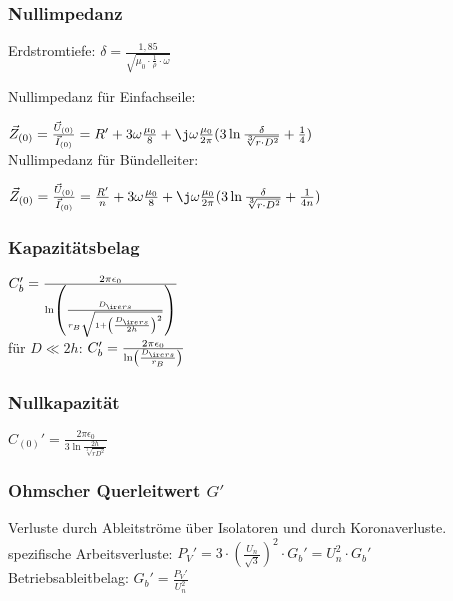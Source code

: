 \documentclass[german]{latex4ei/latex4ei_sheet}
\begin{document}
\begin{sectionbox}

	\subsubsection{Nullimpedanz}

	Erdstromtiefe: $\delta = \frac{1,85}{\sqrt{\mu_0 \cdot \frac{1}{\rho} \cdot \omega} }$

	Nullimpedanz für Einfachseile:

	$\vec Z_{(0)} = \frac{\vec U_{(0)}}{\vec I_{(0)}} = R' + 3 \omega \frac{\mu_0}{8}+ \j \omega \frac{\mu_0}{2\pi} (3 \ln \frac{\delta}{\sqrt[3]{r \cdot D^2}} + \frac{1}{4})$ \\

	Nullimpedanz für Bündelleiter:

	$\vec Z_{(0)} = \frac{\vec U_{(0)}}{\vec I_{(0)}} = \frac{R'}{n} + 3 \omega \frac{\mu_0}{8}+ \j \omega \frac{\mu_0}{2\pi} (3 \ln \frac{\delta}{\sqrt[3]{r \cdot D^2}} + \frac{1}{4n})$
\end{sectionbox}

\begin{sectionbox}
\subsubsection{Kapazitätsbelag}
 $C_b ' = \frac{2 \pi \epsilon_0}{\ln \left( \frac{D_{\ir ers}}{r_B \sqrt{1 + \left( \frac{D_{\ir ers}}{2 h}\right)^2 } }\right)} $ \\

für $D \ll 2h$: $C_b' = \frac{2 \pi \epsilon_0}{\ln \left( \frac{D_{\ir ers}}{ r_B} \right) }$ \\
\end{sectionbox}

\begin{sectionbox}
	\subsubsection{Nullkapazität}

	$C_{(0)}' = \frac{2\pi \epsilon_0}{3 \ln \frac{2h}{\sqrt[3]{rD^2}}}$

\end{sectionbox}

\begin{sectionbox}
\subsubsection{Ohmscher Querleitwert $G'$}
Verluste durch Ableitströme über Isolatoren und durch Koronaverluste. \\

spezifische Arbeitsverluste: $P_V' = 3 \cdot \left( \frac{U_n}{\sqrt{3}} \right)^2 \cdot G_b' = U_n^2 \cdot G_b'$ \\

Betriebsableitbelag: $G_b' = \frac{P_V'}{U_n^2}$
\end{sectionbox}
\end{document}
